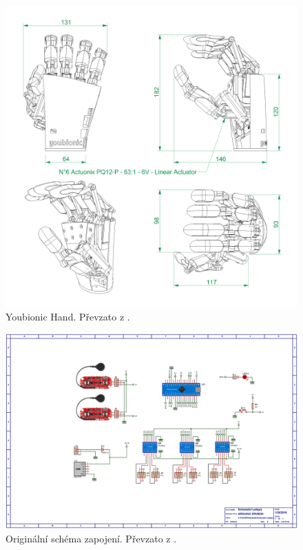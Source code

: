 \documentclass[thesis=B,czech]{FITthesis}[2012/06/26]
\begin{document}
\begin{figure}[H]
\centering
\includegraphics[scale=0.20]{./image/Youbionic-Hand-Technical-Drawing.jpg}
\caption{Youbionic Hand. Převzato z \cite{youBionPic}.}
\label{fig:section-search}

\end{figure}


\begin{figure}[H]
\centering
\includegraphics[scale=0.16, angle=90]{./image/YoubionicHandschematic.png}
\caption{Originální schéma zapojení. Převzato z \cite{youBionPic}.}
\label{fig:schema1}

\end{figure}
\end{document}
